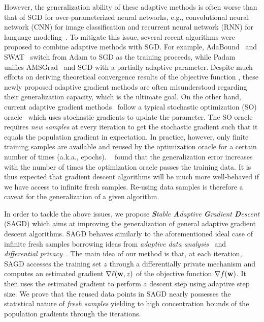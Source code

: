 \documentclass[11pt]{article}
\begin{document}
However, the generalization ability of these adaptive methods is often worse than that of SGD for over-parameterized neural networks, e.g., convolutional neural network (CNN) for image classification and recurrent neural network (RNN) for language modeling~\citep{wiro17}. 
To mitigate this issue, several recent algorithms were proposed to combine adaptive methods with SGD.
For example, AdaBound~\citep{luxi2019} and SWAT~\citep{keso2017} switch from Adam to SGD as the training proceeds, while Padam~\citep{chgu2018, zhta18} unifies AMSGrad~\citep{reka2018} and SGD with a partially adaptive parameter.  
Despite much efforts on deriving theoretical convergence results of the objective function \citep{zare18,wawu19, zosh2019, cheli2019}, these newly proposed adaptive gradient methods are often misunderstood regarding their generalization capacity, which is the ultimate goal.
On the other hand, current adaptive gradient methods~\citep{duha11,kiba15,tige12, reka2018, wawu19} follow a typical stochastic optimization (SO) oracle~\citep{romo51, ghla2013} which uses stochastic gradients to update the parameter. The SO oracle requires \emph{new samples} at every iteration to get the stochastic gradient such that it equals the population gradient in expectation. In practice, however, only finite training samples are available and reused by the optimization oracle for a certain number of times (a.k.a., epochs). 
~\citet{hare2016} found that the generalization error increases with the number of times the optimization oracle passes the training data. 
It is thus expected that gradient descent algorithms will be much more well-behaved if we have access to infinite fresh samples. 
Re-using data samples is therefore a caveat for the generalization of a given algorithm.

In order to tackle the above issues, we propose \textit{\textbf{S}table \textbf{A}daptive \textbf{G}radient \textbf{D}escent} (\textsc{SAGD}) which aims at improving the generalization of general adaptive gradient descent algorithms.
\textsc{SAGD} behaves similarly to the aforementioned ideal case of infinite fresh samples borrowing ideas from \emph{adaptive data analysis}~\citep{dwfe15} and \emph{differential privacy}~\citep{dwro2014}. 
The main idea of our method is that, at each iteration, \textsc{SAGD} accesses the training set $z$ through a differentially private mechanism and computes an estimated gradient $\nabla \ell(\mathbf{w},z)$ of the objective function $\nabla f(\mathbf{w})$. 
It then uses the estimated gradient to perform a descent step using adaptive step size. 
We prove that the reused data points in \textsc{SAGD} nearly possesses the statistical nature of \emph{fresh samples} yielding to high concentration bounds of the population gradients through the iterations.
\end{document}
